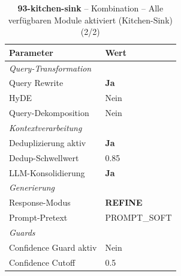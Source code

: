 \begin{table}[H]
\centering
\small
\setlength{\tabcolsep}{4pt}
\begin{tabular}{lp{8cm}}
\toprule
\textbf{Parameter} & \textbf{Wert} \\
\midrule
\multicolumn{2}{l}{\textit{Query-Transformation}} \\
\midrule
\quad Query Rewrite & \textbf{Ja} \\
\quad HyDE & Nein \\
\quad Query-Dekomposition & Nein \\
\midrule
\multicolumn{2}{l}{\textit{Kontextverarbeitung}} \\
\midrule
\quad Deduplizierung aktiv & \textbf{Ja} \\
\quad Dedup-Schwellwert & 0.85 \\
\quad LLM-Konsolidierung & \textbf{Ja} \\
\midrule
\multicolumn{2}{l}{\textit{Generierung}} \\
\midrule
\quad Response-Modus & \textbf{REFINE} \\
\quad Prompt-Pretext & PROMPT\_SOFT \\
\midrule
\multicolumn{2}{l}{\textit{Guards}} \\
\midrule
\quad Confidence Guard aktiv & Nein \\
\quad Confidence Cutoff & 0.5 \\
\bottomrule
\end{tabular}
\caption{\textbf{93-kitchen-sink} -- Kombination -- Alle verfügbaren Module aktiviert (Kitchen-Sink) (2/2)}
\label{tab:config_93_kitchen_sink_b}
\end{table}